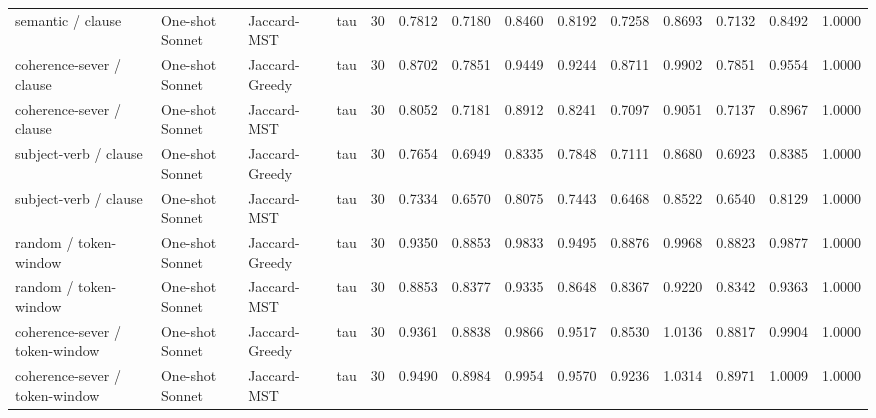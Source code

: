 \begin{table}[t]
{\begin{tabular}{llllllllllllll}
semantic / clause & One-shot Sonnet & Jaccard-MST & tau & 30 & 0.7812 & 0.7180 & 0.8460 & 0.8192 & 0.7258 & 0.8693 & 0.7132 & 0.8492 & 1.0000 \\
coherence-sever / clause & One-shot Sonnet & Jaccard-Greedy & tau & 30 & 0.8702 & 0.7851 & 0.9449 & 0.9244 & 0.8711 & 0.9902 & 0.7851 & 0.9554 & 1.0000 \\
coherence-sever / clause & One-shot Sonnet & Jaccard-MST & tau & 30 & 0.8052 & 0.7181 & 0.8912 & 0.8241 & 0.7097 & 0.9051 & 0.7137 & 0.8967 & 1.0000 \\
subject-verb / clause & One-shot Sonnet & Jaccard-Greedy & tau & 30 & 0.7654 & 0.6949 & 0.8335 & 0.7848 & 0.7111 & 0.8680 & 0.6923 & 0.8385 & 1.0000 \\
subject-verb / clause & One-shot Sonnet & Jaccard-MST & tau & 30 & 0.7334 & 0.6570 & 0.8075 & 0.7443 & 0.6468 & 0.8522 & 0.6540 & 0.8129 & 1.0000 \\
random / token-window & One-shot Sonnet & Jaccard-Greedy & tau & 30 & 0.9350 & 0.8853 & 0.9833 & 0.9495 & 0.8876 & 0.9968 & 0.8823 & 0.9877 & 1.0000 \\
random / token-window & One-shot Sonnet & Jaccard-MST & tau & 30 & 0.8853 & 0.8377 & 0.9335 & 0.8648 & 0.8367 & 0.9220 & 0.8342 & 0.9363 & 1.0000 \\
coherence-sever / token-window & One-shot Sonnet & Jaccard-Greedy & tau & 30 & 0.9361 & 0.8838 & 0.9866 & 0.9517 & 0.8530 & 1.0136 & 0.8817 & 0.9904 & 1.0000 \\
coherence-sever / token-window & One-shot Sonnet & Jaccard-MST & tau & 30 & 0.9490 & 0.8984 & 0.9954 & 0.9570 & 0.9236 & 1.0314 & 0.8971 & 1.0009 & 1.0000 \\
\bottomrule
\end{tabular}}
\end{table}
